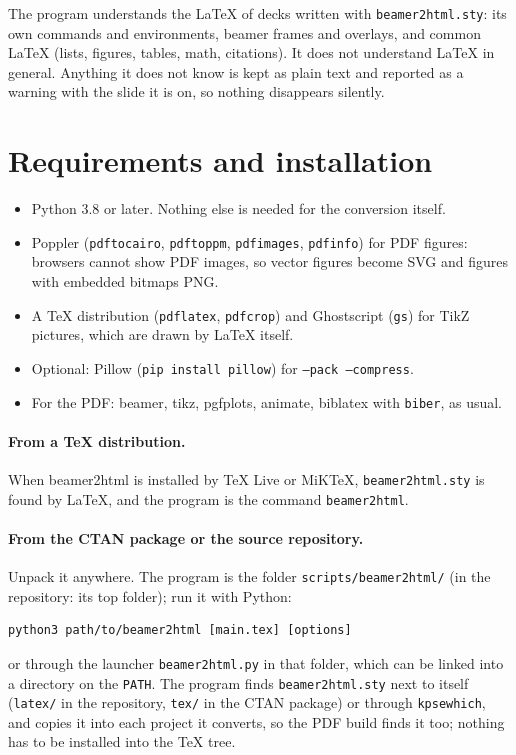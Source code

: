 \documentclass[a4paper,11pt]{article}
\newcommand\pkg{\textsf{beamer2html}}
\newcommand\opt[1]{\texttt{#1}}
\newcommand\file[1]{\texttt{#1}}
\begin{document}
The program understands the LaTeX of decks written with
\file{beamer2html.sty}: its own commands and environments, beamer frames and
overlays, and common LaTeX (lists, figures, tables, math, citations). It does
not understand LaTeX in general. Anything it does not know is kept as plain
text and reported as a warning with the slide it is on, so nothing
disappears silently.

\section{Requirements and installation}

\begin{itemize}
\item Python 3.8 or later. Nothing else is needed for the conversion itself.
\item Poppler (\texttt{pdftocairo}, \texttt{pdftoppm}, \texttt{pdfimages},
  \texttt{pdfinfo}) for PDF figures: browsers cannot show PDF images, so
  vector figures become SVG and figures with embedded bitmaps PNG.
\item A TeX distribution (\texttt{pdflatex}, \texttt{pdfcrop}) and
  Ghostscript (\texttt{gs}) for TikZ pictures, which are drawn by LaTeX
  itself.
\item Optional: Pillow (\texttt{pip install pillow}) for
  \opt{--pack --compress}.
\item For the PDF: beamer, \textsf{tikz}, \textsf{pgfplots},
  \textsf{animate}, \textsf{biblatex} with \texttt{biber}, as usual.
\end{itemize}

\paragraph{From a TeX distribution.} When \pkg{} is installed by TeX Live or
MiKTeX, \file{beamer2html.sty} is found by LaTeX, and the program is the
command \texttt{beamer2html}.

\paragraph{From the CTAN package or the source repository.} Unpack it
anywhere. The program is the folder \file{scripts/beamer2html/} (in the
repository: its top folder); run it with Python:
\begin{Verbatim}
python3 path/to/beamer2html [main.tex] [options]
\end{Verbatim}
or through the launcher \file{beamer2html.py} in that folder, which can be
linked into a directory on the \texttt{PATH}. The program finds
\file{beamer2html.sty} next to itself (\file{latex/} in the repository,
\file{tex/} in the CTAN package) or through \texttt{kpsewhich}, and copies
it into each project it converts, so the PDF build finds it too; nothing has
to be installed into the TeX tree.
\end{document}
